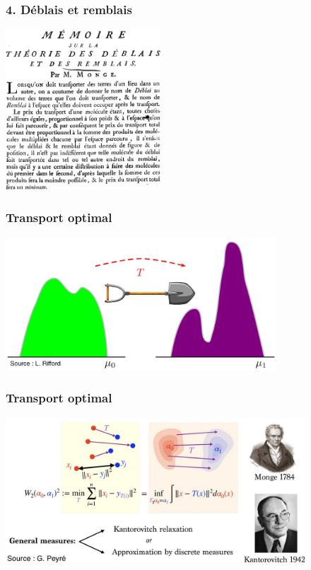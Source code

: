\documentclass[9pt]{beamer}
\begin{document}
\begin{frame}
\frametitle{\bf 4. D\'eblais et remblais}
 
\centering \includegraphics[height=6.0cm]{deblais2}

\end{frame}

\begin{frame}
\frametitle{\bf Transport optimal}
 
\centering \includegraphics[height=5.0cm]{ot1}

\end{frame}

\begin{frame}
\frametitle{\bf Transport optimal}
 
\centering \includegraphics[height=5.5cm]{ot2}

\end{frame}
\end{document}
